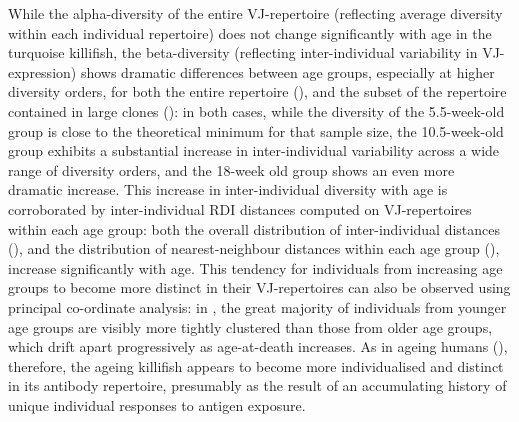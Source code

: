 While the alpha-diversity of the entire VJ-repertoire (reflecting average diversity within each individual repertoire) does not change significantly with age in the turquoise killifish, the beta-diversity (reflecting inter-individual variability in VJ-expression) shows dramatic differences between age groups, especially at higher diversity orders, for both the entire repertoire (), and the subset of the repertoire contained in large clones (): in both cases, while the diversity of the 5.5-week-old group is close to the theoretical minimum for that sample size, the 10.5-week-old group exhibits a substantial increase in inter-individual variability across a wide range of diversity orders, and the 18-week old group shows an even more dramatic increase. This increase in inter-individual diversity with age is corroborated by inter-individual RDI distances computed on VJ-repertoires within each age group: both the overall distribution of inter-individual distances (), and the distribution of nearest-neighbour distances within each age group (), increase significantly with age. This tendency for individuals from increasing age groups to become more distinct in their VJ-repertoires can also be observed using principal co-ordinate analysis:  in , the great majority of individuals from younger age groups are visibly more tightly clustered than those from older age groups, which drift apart progressively as age-at-death increases. As in ageing humans (), therefore, the ageing killifish appears to become more individualised and distinct in its antibody repertoire, presumably as the result of an accumulating history of unique individual responses to antigen exposure.

